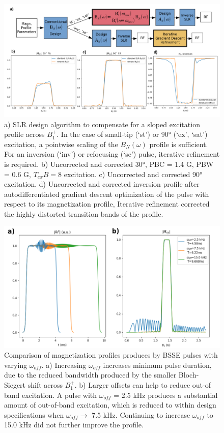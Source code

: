 \documentclass{article}
\begin{document}
\begin{figure}[h]
\centering
\includegraphics[width=1\textwidth]{figures/beta_filt_flowchart.png}
\caption{a) SLR design algorithm to compensate for a sloped excitation profile across $B_1^+$. In the case of small-tip (`st') or 90° (`ex', `sat') excitation, a
pointwise scaling of the $B_N (\omega)$ profile is sufficient. 
For an inversion (`inv') or refocusing (`se') pulse, iterative refinement is required. 
b) Uncorrected and corrected 30°, PBC = 1.4 G, PBW = 0.6 G, $T_{ex}B=8$ excitation.
c) Uncorrected and corrected 90° excitation. 
d) Uncorrected and corrected inversion profile after
autodifferentiated gradient descent optimization of the pulse with respect to its magnetization profile, Iterative refinement corrected the highly distorted transition bands of the profile.}
\label{fig:ramp}
\end{figure}

\begin{figure}[h]
\centering
\includegraphics[width=1\textwidth]{figures/bs_offset_comparison_processed.png}
\caption{Comparison of magnetization profiles produces by BSSE pulses with varying $\omega_{off}$. 
a) Increasing $\omega_{off}$ increases minimum pulse duration, 
due to the reduced bandwidth produced by the smaller Bloch-Siegert shift across $B_1^+$. 
b) Larger offsets can help to reduce out-of band excitation. 
A pulse with $\omega_{off}$ = 2.5 kHz produces a substantial amount of out-of-band excitation, 
which is reduced to within design specifications when $\omega_{off} \rightarrow$ 7.5 kHz. 
Continuing to increase $\omega_{off}$ to 15.0 kHz did not further improve the profile.}
\label{fig:bsse_offres_comp}
\end{figure}
\end{document}
